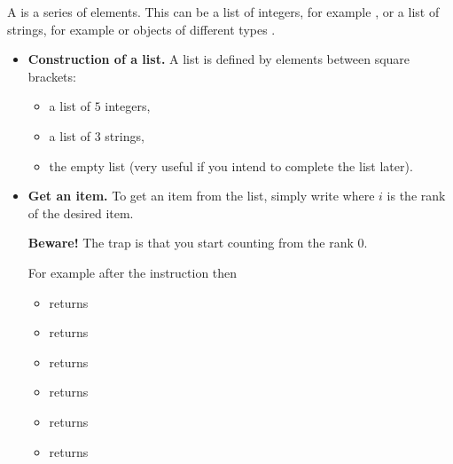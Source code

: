 \documentclass[11pt,class=report,crop=false]{standalone}
\begin{document}
\newcommand{\badletter}[1]{\underline{\underline{\textcolor{red}{#1}}}}






\begin{cours}[List (1)]

A  is a series of elements. This can be a list of integers, for example \ci{[5,-7,12,99]}, or a list of strings, for example  or objects of different types \ci{[3.14,"pi",10e-3,"x",True]}.

\begin{itemize}
  \item \textbf{Construction of a list.} A list is defined by elements between square brackets:
  \begin{itemize}
    \item {} a list of $5$ integers,
    \item {} a list of $3$ strings,
    \item {} the empty list (very useful if you intend to complete the list later).
  \end{itemize}

  \item \textbf{Get an item.} To get an item from the list, simply write  where $i$ is the rank of the desired item. 
  
  \textbf{Beware!} The trap is that you start counting from the rank $0$. 
  
  For example after the instruction  then  
  \begin{itemize}
    \item {} returns 
    \item {} returns 
    \item {} returns 
    \item {} returns 
    \item {} returns 
    \item {} returns                    
  \end{itemize}  
  

\end{itemize}
\end{cours}
\end{document}
